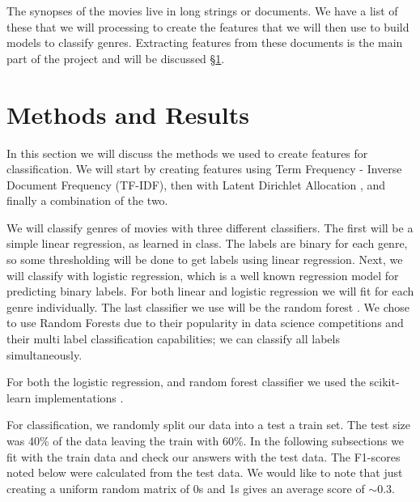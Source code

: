 \documentclass[11pt]{article}
\begin{document}


The synopses of the movies live in long strings or documents. We have a list of these that we will processing to create the features that we will then use to build models to classify genres. Extracting features from these documents is the main part of the project and will be discussed \S \ref{sec:methods}.

\section{Methods and Results}
\label{sec:methods}

In this section we will discuss the methods we used to create features for classification. We will start by creating features using Term Frequency - Inverse Document Frequency (TF-IDF), then with Latent Dirichlet Allocation \cite{blei2003}, and finally a combination of the two. 

We will classify genres of movies with three different classifiers. The first will be a simple linear regression, as learned in class. The labels are binary for each genre, so some thresholding will be done to get labels using linear regression. Next, we will classify with logistic regression, which is a well known regression model for predicting binary labels. For both linear and logistic regression we will fit for each genre individually. The last classifier we use will be the random forest \cite{breiman2001}. We chose to use Random Forests due to their popularity in data science competitions and their multi label classification capabilities; we can classify all labels simultaneously. 

For both the logistic regression, and random forest classifier we used the scikit-learn implementations \cite{scikit-learn}.

For classification, we randomly split our data into a test a train set. The test size was 40\% of the data leaving the train with 60\%. In the following subsections we fit with the train data and check our answers with the test data. The F1-scores noted below were calculated from the test data. We would like to note that just creating a uniform random matrix of 0s and 1s gives an average score of $\sim0.3$.
\end{document}
